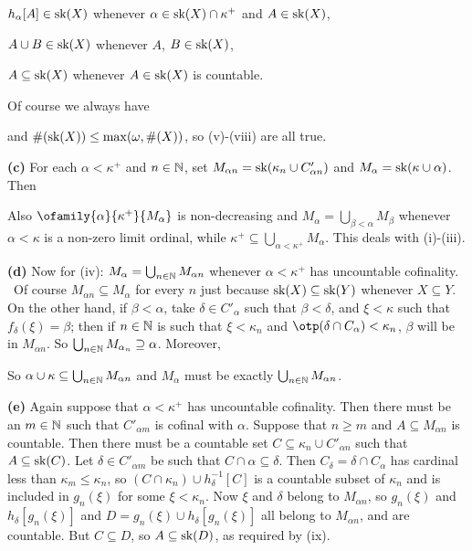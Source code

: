 {{$h_{\alpha}[A]\in\mathop{\text{sk}}(X)$ whenever $\alpha\in\mathop{\text{sk}}(X)\cap\kappa^+$ and
$A\in\mathop{\text{sk}}(X)$,

$A\cup B\in\mathop{\text{sk}}(X)$ whenever $A$, $B\in\mathop{\text{sk}}(X)$,

$A\subseteq\mathop{\text{sk}}(X)$ whenever $A\in\mathop{\text{sk}}(X)$ is countable.
}%

\noindent  Of course we always have


\noindent and $\#(\mathop{\text{sk}}(X))\le\max(\omega,\#(X))$, so (v)-(viii) are all
true.

\medskip

{\bf (c)} For each $\alpha<\kappa^+$ and $n\in\Bbb N$, set
$M_{\alpha n}=\mathop{\text{sk}}(\kappa_n\cup C'_{\alpha n})$ and
$M_{\alpha}=\mathop{\text{sk}}(\kappa\cup\alpha)$.   Then


\noindent Also $\ofamily{\alpha}{\kappa^+}{M_{\alpha}}$ is
non-decreasing and $M_{\alpha}=\bigcup_{\beta<\alpha}M_{\beta}$ whenever
$\alpha<\kappa$ is a non-zero limit ordinal, while
$\kappa^+\subseteq\bigcup_{\alpha<\kappa^+}M_{\alpha}$.  This deals with
(i)-(iii).

\medskip

{\bf (d)} Now for (iv):
$M_{\alpha}=\bigcup_{n\in\Bbb N}M_{\alpha n}$ whenever
$\alpha<\kappa^+$ has uncountable cofinality.   \Prf\ Of course
$M_{\alpha n}\subseteq M_{\alpha}$ for every $n$ just because
$\mathop{\text{sk}}(X)\subseteq\mathop{\text{sk}}(Y)$ whenever $X\subseteq Y$.   On the other hand,
if $\beta<\alpha$, take $\delta\in C'_{\alpha}$ such that
$\beta<\delta$, and $\xi<\kappa$ such that $f_{\delta}(\xi)=\beta$;
then if $n\in\Bbb N$ is such that $\xi<\kappa_n$ and
$\otp(\delta\cap C_{\alpha})<\kappa_n$,
$\beta$ will be in $M_{\alpha n}$.   So
$\bigcup_{n\in\Bbb N}M_{\alpha_n}\supseteq\alpha$.   Moreover,


\noindent So
$\alpha\cup\kappa\subseteq\bigcup_{n\in\Bbb N}M_{\alpha n}$ and
$M_{\alpha}$ must be exactly $\bigcup_{n\in\Bbb N}M_{\alpha n}$.\ \Qed

\medskip

{\bf (e)} Again suppose that $\alpha<\kappa^+$ has uncountable cofinality.
Then there must be an $m\in\Bbb N$ such that $C'_{\alpha m}$ is cofinal
with $\alpha$.   Suppose that $n\ge m$ and
$A\subseteq M_{\alpha n}$ is countable.
Then there must be a countable set $C\subseteq\kappa_n\cup C'_{\alpha n}$
such that $A\subseteq\mathop{\text{sk}}(C)$.   Let $\delta\in C'_{\alpha m}$ be such that
$C\cap\alpha\subseteq\delta$.   Then
$C_{\delta}=\delta\cap C_{\alpha}$ has cardinal less than
$\kappa_m\le\kappa_n$, so $(C\cap\kappa_n)\cup h_{\delta}^{-1}[C]$
is a countable subset of $\kappa_n$ and is included in $g_n(\xi)$ for
some $\xi<\kappa_n$.
Now $\xi$ and $\delta$ belong to $M_{\alpha n}$, so $g_n(\xi)$
and $h_{\delta}[g_n(\xi)]$ and $D=g_n(\xi)\cup h_{\delta}[g_n(\xi)]$ all
belong to $M_{\alpha n}$, and are countable.   But $C\subseteq D$, so
$A\subseteq\mathop{\text{sk}}(D)$, as required by (ix).

}

